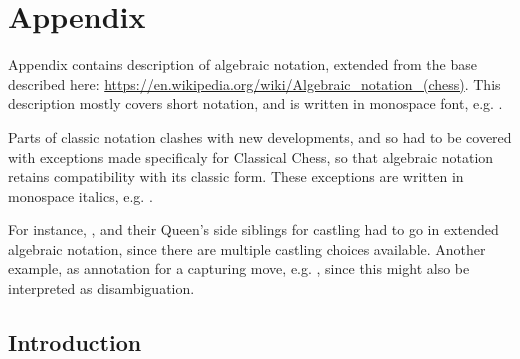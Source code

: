 

\chapter*{Appendix}
\label{ch:Appendix}

Appendix contains description of algebraic notation, extended from the base described here: \newline
\href{https://en.wikipedia.org/wiki/Algebraic\_notation\_(chess)}{https://en.wikipedia.org/wiki/Algebraic\_notation\_(chess)}. \newline
This description mostly covers short notation, and is written in monospace font, e.g. .

Parts of classic notation clashes with new developments, and so had to be covered with
exceptions made specificaly for Classical Chess, so that algebraic notation retains
compatibility with its classic form. These exceptions are written in monospace italics,
e.g. .

For instance, ,  and their Queen's side siblings for castling had
to go in extended algebraic notation, since there are multiple castling choices available.
Another example,  as annotation for a capturing move, e.g. , since
this might also be interpreted as disambiguation.

\clearpage %

\section*{Introduction}
\label{sec:Appendix/Introduction}

